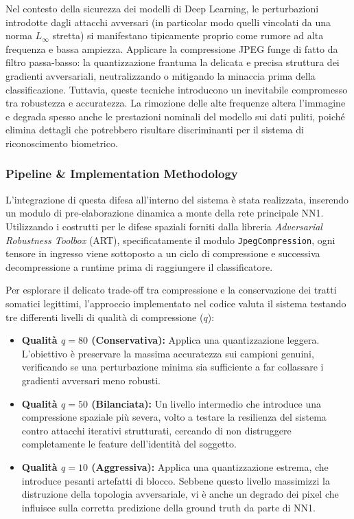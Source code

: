 \documentclass[a4paper, 12pt]{article}
\begin{document}
Nel contesto della sicurezza dei modelli di Deep Learning, le perturbazioni introdotte dagli 
attacchi avversari (in particolar modo quelli vincolati da una norma $L_\infty$ stretta) 
si manifestano tipicamente proprio come rumore ad alta frequenza e bassa ampiezza. Applicare 
la compressione JPEG funge di fatto da filtro passa-basso: la quantizzazione frantuma la 
delicata e precisa struttura dei gradienti avversariali, neutralizzando o mitigando la 
minaccia prima della classificazione. 
Tuttavia, queste tecniche introducono un inevitabile compromesso tra robustezza e accuratezza. 
La rimozione delle alte frequenze altera l'immagine e degrada spesso anche le 
prestazioni nominali del modello sui dati puliti, poiché elimina dettagli che potrebbero 
risultare discriminanti per il sistema di riconoscimento biometrico.

\subsubsection{Pipeline \& Implementation Methodology}
L'integrazione di questa difesa all'interno del sistema è stata realizzata, inserendo un modulo 
di pre-elaborazione dinamica a monte della rete principale 
NN1. Utilizzando i costrutti per le difese spaziali forniti dalla libreria \textit{Adversarial Robustness Toolbox} (ART), 
specificatamente il modulo \texttt{JpegCompression}, ogni tensore in ingresso viene 
sottoposto a un ciclo di compressione e successiva decompressione a runtime prima di 
raggiungere il classificatore.

Per esplorare il delicato trade-off tra compressione e 
la conservazione dei tratti somatici legittimi, l'approccio implementato nel codice valuta il
sistema testando tre differenti livelli di qualità di compressione ($q$):
\begin{itemize}
    \item \textbf{Qualità $q = 80$ (Conservativa):} Applica una quantizzazione leggera. 
    L'obiettivo è preservare la massima accuratezza sui campioni genuini, verificando 
    se una perturbazione minima sia sufficiente a far collassare i gradienti avversari 
    meno robusti.
    \item \textbf{Qualità $q = 50$ (Bilanciata):} Un livello intermedio che introduce una 
    compressione spaziale più severa, volto a testare la resilienza del sistema contro
    attacchi iterativi strutturati, cercando di non distruggere completamente le 
    feature dell'identità del soggetto.
    \item \textbf{Qualità $q = 10$ (Aggressiva):} Applica una quantizzazione estrema, 
    che introduce pesanti artefatti di blocco. Sebbene questo livello massimizzi la 
    distruzione della topologia avversariale, vi è anche un degrado dei pixel che influisce
    sulla corretta predizione della ground truth da parte di NN1.
\end{itemize}
\end{document}
